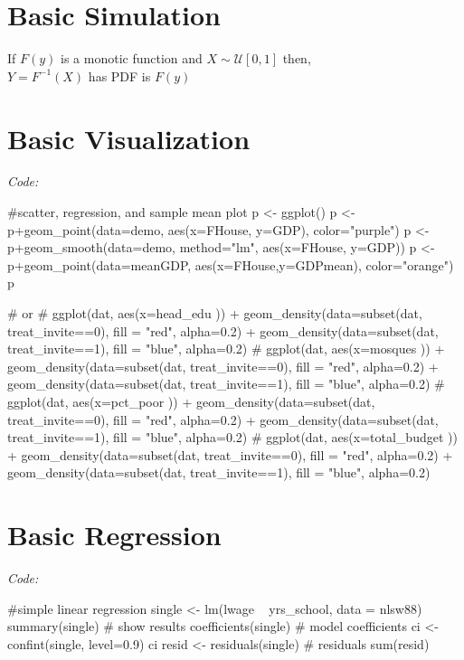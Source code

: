 \section{Basic Simulation}
If $F(y)$ is a monotic function and $X \sim \mathcal{U}[0, 1]$ then,\\
$Y = F^{-1}(X)$ has PDF is $F(y)$
\section{Basic Visualization}
\textit{Code: }
\begin{spverbatim}
#scatter, regression, and sample mean plot
p <- ggplot()
p <- p+geom_point(data=demo, aes(x=FHouse, y=GDP), color="purple")
p <- p+geom_smooth(data=demo, method="lm", aes(x=FHouse, y=GDP))
p <- p+geom_point(data=meanGDP, aes(x=FHouse,y=GDPmean), color="orange")
p

# or
# ggplot(dat, aes(x=head_edu )) + geom_density(data=subset(dat, treat_invite==0), fill = "red", alpha=0.2) + geom_density(data=subset(dat, treat_invite==1), fill = "blue", alpha=0.2)
# ggplot(dat, aes(x=mosques )) + geom_density(data=subset(dat, treat_invite==0), fill = "red", alpha=0.2) + geom_density(data=subset(dat, treat_invite==1), fill = "blue", alpha=0.2)
# ggplot(dat, aes(x=pct_poor )) + geom_density(data=subset(dat, treat_invite==0), fill = "red", alpha=0.2) + geom_density(data=subset(dat, treat_invite==1), fill = "blue", alpha=0.2)
# ggplot(dat, aes(x=total_budget )) + geom_density(data=subset(dat, treat_invite==0), fill = "red", alpha=0.2) + geom_density(data=subset(dat, treat_invite==1), fill = "blue", alpha=0.2)
\end{spverbatim}
\section{Basic Regression}
\textit{Code: }
\begin{spverbatim}
#simple linear regression
single <- lm(lwage ~ yrs_school, data = nlsw88)
summary(single) # show results
coefficients(single) # model coefficients
ci <- confint(single, level=0.9) 
ci
resid <- residuals(single) # residuals
sum(resid)
\end{spverbatim}